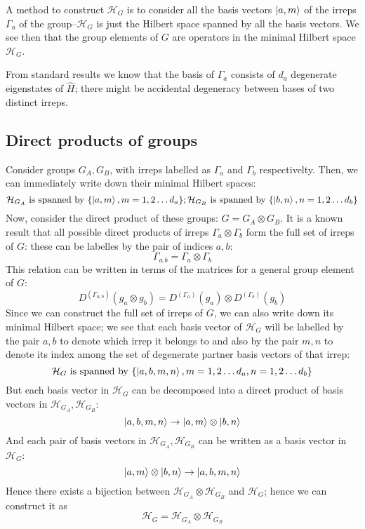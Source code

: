 \documentclass[12pt]{article}
\begin{document}
	A method to construct $\mathcal{H}_G$ is to consider all the basis vectors $\ket{a,m}$ of the irreps $\Gamma_a$ of the group--$\mathcal{H}_G$ is just the Hilbert space spanned by all the basis vectors. We see then that the group elements of $G$ are operators in the minimal Hilbert space $\mathcal{H}_G$.
	
	From standard results we know that the basis of $\Gamma_a$ consists of $d_a$ degenerate eigenstates of $\hat{H}$; there might be accidental degeneracy between bases of two distinct irreps.
	
	\subsection{Direct products of groups}
	
	Consider groups $G_A, G_B$, with irreps labelled as $\Gamma_a$ and $\Gamma_b$ respectivelty. Then, we can immediately write down their minimal Hilbert spaces:
	$$\mathcal{H}_{G_A}\text{ is spanned by }\{\ket{a,m}, m=1,2\dots d_a\}; \mathcal{H}_{G_B}\text{ is spanned by }\{\ket{b,n}, n=1,2\dots d_b\}$$
	Now, consider the direct product of these groups: $G=G_A\otimes G_B$. It is a known result that all possible direct products of irreps $\Gamma_a\otimes\Gamma_b$ form the full set of irreps of $G$: these can be labelles by the pair of indices $a,b$:
	$$\Gamma_{a.b}=\Gamma_a\otimes\Gamma_b$$
	This relation can be written in terms of the matrices for a general group element of $G$:
	$$D^{\left(\Gamma_{a,b}\right)}(g_a \otimes g_b)=D^{\left(\Gamma_{a}\right)}(g_a) \otimes D^{\left(\Gamma_{b}\right)}(g_b)$$
	Since we can construct the full set of irreps of $G$, we can also write down its minimal Hilbert space; we see that each basis vector of $\mathcal{H}_G$ will be labelled by the pair $a,b$ to denote which irrep it belongs to and also by the pair $m,n$ to denote its index among the set of degenerate partner basis vectors of that irrep:
	$$\mathcal{H}_G\text{ is spanned by }\{\ket{a,b,m,n}, m=1,2\dots d_a,n=1,2\dots d_b\}$$
	But each basis vector in $\mathcal{H}_G$ can be decomposed into a direct product of basis vectors in $\mathcal{H}_{G_A},\mathcal{H}_{G_B}$:
	$$\ket{a,b,m,n}\to\ket{a,m}\otimes\ket{b,n}$$
	And each pair of basis vectors in $\mathcal{H}_{G_A},\mathcal{H}_{G_B}$ can be written as a basis vector in $\mathcal{H}_G$:
	$$\ket{a,m}\otimes\ket{b,n}\to\ket{a,b,m,n}$$
	Hence there exists a bijection between $\mathcal{H}_{G_A}\otimes\mathcal{H}_{G_B}$ and $\mathcal{H}_G$; hence we can construct it as
	$$\mathcal{H}_G=\mathcal{H}_{G_A}\otimes\mathcal{H}_{G_B}$$
	
\end{document}
